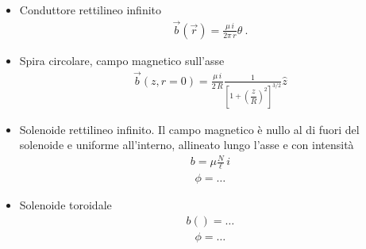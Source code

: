\documentclass[letterpaper,10pt,italian]{jupyterBook}
\begin{document}
\sphinxAtStartPar
{} 
\begin{itemize}
\item {} 
\sphinxAtStartPar
Conduttore rettilineo infinito
\begin{equation*}
\begin{split} \vec{b}(\vec{r}) =   \frac{\mu \, i}{2 \pi \, r} \hat{\theta} \ .\end{split}
\end{equation*}
\item {} 
\sphinxAtStartPar
Spira circolare, campo magnetico sull’asse
\begin{equation*}
\begin{split}\vec{b}(z,r=0) = \frac{\mu \, i}{2 \, R} \frac{1}{\left[1 + \left(\dfrac{z}{R}\right)^2 \right]^{3/2}} \hat{z} \end{split}
\end{equation*}
\item {} 
\sphinxAtStartPar
Solenoide rettilineo infinito. Il campo magnetico è nullo al di fuori del solenoide e uniforme all’interno, allineato lungo l’asse e con intensità
\begin{equation*}
\begin{split}b = \mu \frac{N}{\ell} \, i\end{split}
\end{equation*}\begin{equation*}
\begin{split}\phi = \dots\end{split}
\end{equation*}
\item {} 
\sphinxAtStartPar
Solenoide toroidale
\begin{equation*}
\begin{split}b() = \dots\end{split}
\end{equation*}\begin{equation*}
\begin{split}\phi = \dots\end{split}
\end{equation*}
\end{itemize}
\end{document}
